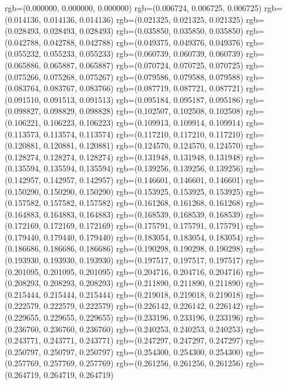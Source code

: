 {{{					rgb=(0.000000, 0.000000, 0.000000)
					rgb=(0.006724, 0.006725, 0.006725)
					rgb=(0.014136, 0.014136, 0.014136)
					rgb=(0.021325, 0.021325, 0.021325)
					rgb=(0.028493, 0.028493, 0.028493)
					rgb=(0.035850, 0.035850, 0.035850)
					rgb=(0.042788, 0.042788, 0.042788)
					rgb=(0.049375, 0.049376, 0.049376)
					rgb=(0.055232, 0.055233, 0.055233)
					rgb=(0.060739, 0.060739, 0.060739)
					rgb=(0.065886, 0.065887, 0.065887)
					rgb=(0.070724, 0.070725, 0.070725)
					rgb=(0.075266, 0.075268, 0.075267)
					rgb=(0.079586, 0.079588, 0.079588)
					rgb=(0.083764, 0.083767, 0.083766)
					rgb=(0.087719, 0.087721, 0.087721)
					rgb=(0.091510, 0.091513, 0.091513)
					rgb=(0.095184, 0.095187, 0.095186)
					rgb=(0.098827, 0.098829, 0.098828)
					rgb=(0.102507, 0.102508, 0.102508)
					rgb=(0.106221, 0.106223, 0.106223)
					rgb=(0.109913, 0.109914, 0.109914)
					rgb=(0.113573, 0.113574, 0.113574)
					rgb=(0.117210, 0.117210, 0.117210)
					rgb=(0.120881, 0.120881, 0.120881)
					rgb=(0.124570, 0.124570, 0.124570)
					rgb=(0.128274, 0.128274, 0.128274)
					rgb=(0.131948, 0.131948, 0.131948)
					rgb=(0.135594, 0.135594, 0.135594)
					rgb=(0.139256, 0.139256, 0.139256)
					rgb=(0.142957, 0.142957, 0.142957)
					rgb=(0.146601, 0.146601, 0.146601)
					rgb=(0.150290, 0.150290, 0.150290)
					rgb=(0.153925, 0.153925, 0.153925)
					rgb=(0.157582, 0.157582, 0.157582)
					rgb=(0.161268, 0.161268, 0.161268)
					rgb=(0.164883, 0.164883, 0.164883)
					rgb=(0.168539, 0.168539, 0.168539)
					rgb=(0.172169, 0.172169, 0.172169)
					rgb=(0.175791, 0.175791, 0.175791)
					rgb=(0.179440, 0.179440, 0.179440)
					rgb=(0.183054, 0.183054, 0.183054)
					rgb=(0.186686, 0.186686, 0.186686)
					rgb=(0.190298, 0.190298, 0.190298)
					rgb=(0.193930, 0.193930, 0.193930)
					rgb=(0.197517, 0.197517, 0.197517)
					rgb=(0.201095, 0.201095, 0.201095)
					rgb=(0.204716, 0.204716, 0.204716)
					rgb=(0.208293, 0.208293, 0.208293)
					rgb=(0.211890, 0.211890, 0.211890)
					rgb=(0.215444, 0.215444, 0.215444)
					rgb=(0.219018, 0.219018, 0.219018)
					rgb=(0.222579, 0.222579, 0.222579)
					rgb=(0.226142, 0.226142, 0.226142)
					rgb=(0.229655, 0.229655, 0.229655)
					rgb=(0.233196, 0.233196, 0.233196)
					rgb=(0.236760, 0.236760, 0.236760)
					rgb=(0.240253, 0.240253, 0.240253)
					rgb=(0.243771, 0.243771, 0.243771)
					rgb=(0.247297, 0.247297, 0.247297)
					rgb=(0.250797, 0.250797, 0.250797)
					rgb=(0.254300, 0.254300, 0.254300)
					rgb=(0.257769, 0.257769, 0.257769)
					rgb=(0.261256, 0.261256, 0.261256)
					rgb=(0.264719, 0.264719, 0.264719)
}}}
